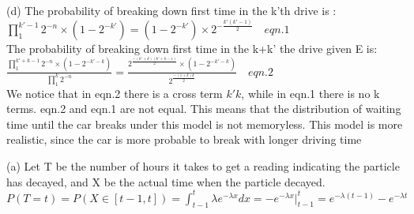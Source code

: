 \documentclass[12pt]{article}
\newenvironment{problem}[2][Problem]{\begin{trivlist}
\item[\hskip \labelsep {\bfseries #1}\hskip \labelsep {\bfseries #2.}]}{\end{trivlist}}
\begin{document}
(d) The probability of breaking  down first time in the k'th drive is :\\
$\prod_1^{k'-1} 2^{-n} \times (1 - 2^{-k'}) = (1 - 2^{-k'})\times 2^{-\frac{k'(k'-1)}{2}}   \quad eqn.1$\\
The probability of breaking down first time in the k+k' the drive given  E is:\\ $\frac{\prod_{1}^{k'+k-1}2^{-n}\times(1 - 2^{-k'-k})}{\prod_{1}^{k} 2^{-n}} =\frac{2^{\frac{-(k'+k)(k'+k-1)}{2}}\times(1 -2^{-k'-k})}{2^{\frac{-(1+k)k}{2}}}  \quad eqn.2$\\
We notice that in eqn.2 there is a cross term $k'k$, while in eqn.1 there is no k terms. eqn.2 and eqn.1 are not equal. This means that the distribution of waiting time until the car breaks under this model is not memoryless. This model is more realistic, since the car is more probable to break with longer driving time

\begin{problem}{4}
\end{problem}

(a)  Let T be the number of hours it takes to get a reading indicating the particle has decayed, and X be the actual time when the particle decayed.\\
$P(T = t) = P(X \in [t-1,t]) = \int_{t-1}^{t} \lambda e^{-\lambda x}dx  = -e^{-\lambda x}|_{t-1}^{t} = e^{-\lambda (t - 1)} - e^{-\lambda t} $\\
\end{document}
